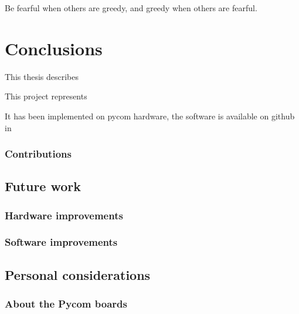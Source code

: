 
\begin{savequote}[70mm]
	Be fearful when others are greedy, and greedy when others are fearful.
\end{savequote}

\chapter{Conclusions}\label{ch:conclusions}

	This thesis describes 
	
	This project represents
	
	It has been implemented on pycom hardware, the software is available on github in 

	\subsection{Contributions}

	\section{Future work}
	
		\subsection{Hardware improvements}
			

		\subsection{Software improvements}

	\section{Personal considerations}
	
		\subsection{About the Pycom boards}
		
